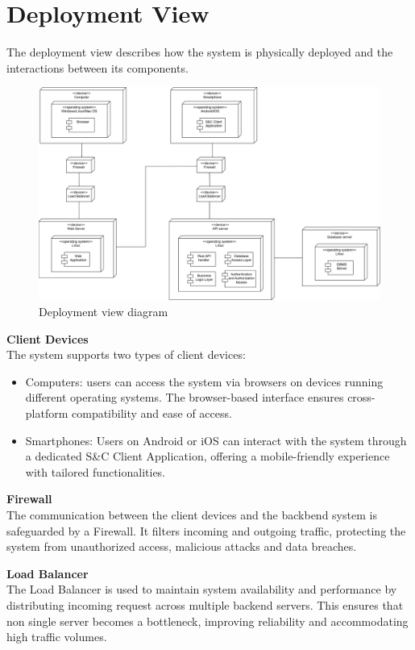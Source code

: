 
\section{Deployment View}
\label{sec:deployment_view}
The deployment view describes how the system is physically deployed and the interactions between its components.
\begin{figure}[H]
    \centering
    \includegraphics[width=1\linewidth]{Images/Deployment diagram/deploymentView.png}
    \caption{Deployment view diagram}
    \label{fig:enter-label}
\end{figure}

\textbf{Client Devices} \\
The system supports two types of client devices:
\begin{itemize}
    \item Computers: users can access the system via browsers on devices running different operating systems. The browser-based interface ensures cross-platform compatibility and ease of access.
    \item Smartphones: Users on Android or iOS can interact with the system through a dedicated S\&C Client Application, offering a mobile-friendly experience with tailored functionalities.
\end{itemize}

\textbf{Firewall} \\
The communication between the client devices and the backbend system is safeguarded by a Firewall. It filters incoming and outgoing traffic, protecting the system from unauthorized access, malicious attacks and data breaches.

\textbf{Load Balancer} \\
The Load Balancer is used to maintain system availability and performance by distributing incoming request across multiple backend servers. This ensures that non single server becomes a bottleneck, improving reliability and accommodating high traffic volumes.

